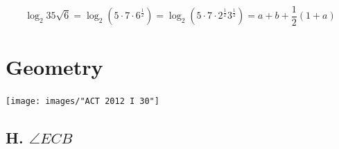 \documentclass[11pt, oneside]{article}
\begin{document}
$$\log_{2}{35\sqrt{6}} 
	= \log_{2} \left( 5 \cdot 7 \cdot 6^{\frac{1}{2}}\right) 
	= \log_{2} \left( 5 \cdot 7 \cdot 2^{\frac{1}{2}}3^{\frac{1}{2}}\right) 
	= a + b + \frac{1}{2}\left( 1+a\right)$$

\section{Geometry}
\texttt{[image: images/"ACT 2012 I 30"]}
\subsection{H. $\angle ECB$}
\end{document}
